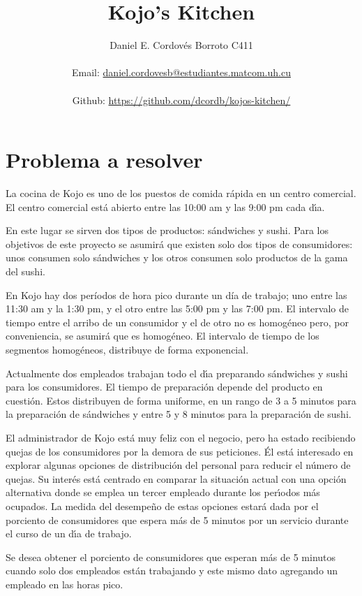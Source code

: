 \documentclass{article}
\author{Daniel E. Cordovés Borroto C411 \\ \\ Email: \href{mailto:daniel.cordovesb@estudiantes.matcom.uh.cu}{daniel.cordovesb@estudiantes.matcom.uh.cu} \\ \\
Github: \href{https://github.com/dcordb/kojos-kitchen/}{https://github.com/dcordb/kojos-kitchen/} }
\title{Kojo's Kitchen}
\begin{document}
	\maketitle
	\newpage
    
    \section*{Problema a resolver}
        La cocina de Kojo es uno de los puestos de comida rápida en un centro
        comercial. El centro comercial está abierto entre las 10:00 am y las 9:00 pm cada
        dı́a.
        
        En este lugar se sirven dos tipos de productos: sándwiches y sushi. Para los
        objetivos de este proyecto se asumirá que existen solo dos tipos de consumidores:
        unos consumen solo sándwiches y los otros consumen solo productos de la gama
        del sushi.
        
        En Kojo hay dos períodos de hora pico durante un día de trabajo;
        uno entre las 11:30 am y la 1:30 pm, y el otro entre las 5:00 pm y las 7:00
        pm. El intervalo de tiempo entre el arribo de un consumidor y el de otro no es
        homogéneo pero, por conveniencia, se asumirá que es homogéneo. El intervalo
        de tiempo de los segmentos homogéneos, distribuye de forma exponencial.

        Actualmente dos empleados trabajan todo el dı́a preparando sándwiches y
        sushi para los consumidores. El tiempo de preparación depende del producto en
        cuestión. Estos distribuyen de forma uniforme, en un rango de 3 a 5 minutos
        para la preparación de sándwiches y entre 5 y 8 minutos para la preparación de
        sushi.

        El administrador de Kojo está muy feliz con el negocio, pero ha estado recibiendo
        quejas de los consumidores por la demora de sus peticiones. Él está interesado
        en explorar algunas opciones de distribución del personal para reducir
        el número de quejas. Su interés está centrado en comparar la situación actual con
        una opción alternativa donde se emplea un tercer empleado durante los perı́odos
        más ocupados. La medida del desempeño de estas opciones estará dada por el
        porciento de consumidores que espera más de 5 minutos por un servicio durante
        el curso de un dı́a de trabajo.

        Se desea obtener el porciento de consumidores que esperan más de 5 minutos
        cuando solo dos empleados están trabajando y este mismo dato agregando un
        empleado en las horas pico.
\end{document}
